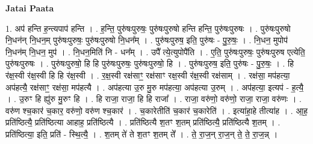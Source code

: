 \documentclass[17pt]{extarticle}
\begin{document}
\textbf{Jatai Paata} \newline

1. अप॑ हन्ति ह॒न्त्यपाप॑ हन्ति । . ह॒न्ति॒ पुरु॑षःपुरुषः॒ पुरु॑षःपुरुषो हन्ति हन्ति॒ पुरु॑षःपुरुषः । . पुरु॑षःपुरुषो नि॒धन॑न् नि॒धन॒म् पुरु॑षःपुरुषः॒ पुरु॑षःपुरुषो नि॒धन᳚म् । . पुरु॑षःपुरुष॒ इति॒ पुरु॑षः - पु॒रु॒षः॒ । . नि॒धन॒ मुपोप॑ नि॒धन॑म् नि॒धन॒ मुप॑ । . नि॒धन॒मिति॑ नि - धन᳚म् । . उपै᳚ त्ये॒त्युपोपै॑ति । . ए॒ति॒ पुरु॑षःपुरुषः॒ पुरु॑षःपुरुष एत्येति॒ पुरु॑षःपुरुषः । . पुरु॑षःपुरुषो॒ हि हि पुरु॑षःपुरुषः॒ पुरु॑षःपुरुषो॒ हि । . पुरु॑षःपुरुष॒ इति॒ पुरु॑षः - पु॒रु॒षः॒ । . हि र॑क्ष॒स्वी र॑क्ष॒स्वी हि हि र॑क्ष॒स्वी । . र॒क्ष॒स्वी रक्ष॑साꣳ॒॒ रक्ष॑साꣳ रक्ष॒स्वी र॑क्ष॒स्वी रक्ष॑साम् । . रक्ष॑सा॒ मप॑हत्या॒ अप॑हत्यै॒ रक्ष॑साꣳ॒॒ रक्ष॑सा॒ मप॑हत्यै । . अप॑हत्या उ॒रु मु॒रु मप॑हत्या॒ अप॑हत्या उ॒रुम् । . अप॑हत्या॒ इत्यप॑ - ह॒त्यै॒ । . उ॒रुꣳ हि ह्यु॑रु मु॒रुꣳ हि । . हि राजा॒ राजा॒ हि हि राजा᳚ । . राजा॒ वरु॑णो॒ वरु॑णो॒ राजा॒ राजा॒ वरु॑णः । . वरु॑ण श्च॒कार॑ च॒कार॒ वरु॑णो॒ वरु॑ण श्च॒कार॑ । . च॒कारेतीति॑ च॒कार॑ च॒कारेति॑ । . इत्या॑हा॒हे तीत्या॑ह । . आ॒ह॒ प्रति॑ष्ठित्यै॒ प्रति॑ष्ठित्या आहाह॒ प्रति॑ष्ठित्यै । . प्रति॑ष्ठित्यै श॒तꣳ श॒तम् प्रति॑ष्ठित्यै॒ प्रति॑ष्ठित्यै श॒तम् । . प्रति॑ष्ठित्या॒ इति॒ प्रति॑ - स्थि॒त्यै॒ । . श॒तम् ते॑ ते श॒तꣳ श॒तम् ते᳚ । . ते॒ रा॒ज॒न् रा॒ज॒न् ते॒ ते॒ रा॒ज॒न्न् । \newline
\end{document}
